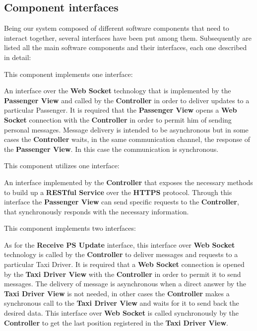 \subsection{Component interfaces}
Being our system composed of different software components that need to interact together, several interfaces have been put among them.
Subsequently are listed all the main software components and their interfaces, each one described in detail:
\begin{itemize}
	This component implements one interface:
	\begin{itemize}
		 An interface over the \textbf{Web Socket} technology that is implemented by the \textbf{Passenger View} and called by the \textbf{Controller} in order to deliver updates to a particular Passenger.
		It is required that the \textbf{Passenger View} opens a \textbf{Web Socket} connection with the \textbf{Controller} in order to permit him of sending personal messages.
		Message delivery is intended to be asynchronous but in some cases the \textbf{Controller} waits, in the same communication channel, the response of the \textbf{Passenger View}. In this case the communication is synchronous.
	\end{itemize}
	This component utilizes one interface:
	\begin{itemize}
		 An interface implemented by the \textbf{Controller} that exposes the necessary methods to build up a \textbf{RESTful Service} over the \textbf{HTTPS} protocol.
		Through this interface the \textbf{Passenger View} can send specific requests to the \textbf{Controller}, that synchronously responds with the necessary information.
	\end{itemize}
	\itemBold{Taxi Driver View}
	This component implements two interfaces:
	\begin{itemize}
		 As for the \textbf{Receive PS Update} interface, this interface over \textbf{Web Socket} technology is called by the \textbf{Controller} to deliver messages and requests to a particular Taxi Driver.
		It is required that a \textbf{Web Socket} connection is opened by the \textbf{Taxi Driver View} with the \textbf{Controller} in order to permit it to send messages.
		The delivery of message is asynchronous when a direct answer by the \textbf{Taxi Driver View} is not needed, in other cases the \textbf{Controller} makes a synchronous call to the \textbf{Taxi Driver View} and waits for it to send back the desired data.
		 This interface over \textbf{Web Socket} is called synchronously by the \textbf{Controller} to get the last position registered in the \textbf{Taxi Driver View}.

\end{itemize}
\end{itemize}
